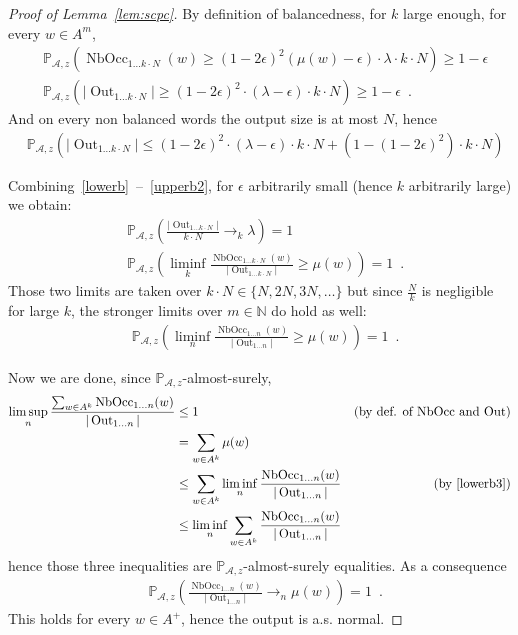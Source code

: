 \documentclass[11pt]{article}
\newcommand{\A}{\mathcal{A}}
\newcommand{\NN}{\mathbb{N}}
\newcommand{\PP}{\mathbb{P}}
\DeclareMathOperator{\nbocc}{NbOcc}
\DeclareMathOperator{\outp}{Out}
\begin{document}
\begin{proof}[Proof of Lemma~\ref{lem:scpc}]
By definition of balancedness, for $k$ large enough, for every $w\in A^m$,
\begin{align}
&\label{lowerb}
\PP_{\A,z}\left(
\nbocc_{1\ldots k\cdot N}(w)
\geq
(1-2\epsilon)^2
\left(\mu(w)- \epsilon\right)
\cdot \lambda \cdot k \cdot N
\right)
\geq  1 - \epsilon
\\
\label{upperb}
&\PP_{\A,z}\left(
|\outp_{1\ldots k\cdot N}|
\geq
(1-2\epsilon)^2\cdot (\lambda -\epsilon) \cdot k\cdot N
\right )\geq  1 - \epsilon
\enspace.
\end{align}
And on every non balanced words the output size is at most $N$, hence
\begin{align}
&\PP_{\A,z}\left(
|\outp_{1\ldots k\cdot N}|
\leq 
(1-2\epsilon)^2\cdot (\lambda -\epsilon) \cdot k\cdot N +
(1 - (1-2\epsilon)^2) \cdot k\cdot N 
\right )
\label{upperb2}
\end{align}


Combining~\eqref{lowerb}~--~\eqref{upperb2}, for $\epsilon$ arbitrarily small
(hence $k$ arbitrarily large)
we obtain:
\begin{align}
&\PP_{\A,z}\left(
\frac{|\outp_{1\ldots k\cdot N}|}{k\cdot N}
\to_k
\lambda
\right)
=1\\
&\PP_{\A,z}
\left(
\liminf_k 
\frac{\nbocc_{1\ldots k\cdot N}(w)}{|\outp_{1\ldots k\cdot N}|}
\geq
\mu(w)
\right)
=1
\enspace.
\end{align}
Those two limits are taken over $k\cdot N\in \{N,2N,3N,\ldots\}$
but 
since $\frac{N}{k}$ is negligible for large $k$, the stronger limits over $m\in \NN$ do hold as well:
\begin{align}
\label{lowerb3}
&\PP_{\A,z}
\left(
\liminf_n
\frac{\nbocc_{1\ldots n}(w)}{|\outp_{1\ldots n}|}
\geq
\mu(w)
\right)
=1
\enspace.
\end{align}

Now we are  done,
since $\PP_{\A,z}$-almost-surely,
\begin{align*}
\limsup_n   \frac{\sum_{w \in A^k} \nbocc_{1\ldots n}(w)}{|\outp_{1\ldots n}|}
&\leq
1& 
\text{(by def. of $\nbocc$ and $\outp$)}\\
&=
\sum_{w \in A^k}
\mu(w)&
\\
&\leq
\sum_{w \in A^k}
\liminf_n
\frac{\nbocc_{1\ldots n}(w)}{|\outp_{1\ldots n}|}
&\text{(by~\eqref{lowerb3})}\\
&\leq
\liminf_n
\sum_{w \in A^k}
\frac{\nbocc_{1\ldots n}(w)}{|\outp_{1\ldots n}|}
&
\end{align*}
hence those three inequalities are $\PP_{\A,z}$-almost-surely equalities.
As a consequence
\begin{align}
&\PP_{\A,z}
\left(
\frac{\nbocc_{1\ldots n}(w)}{|\outp_{1\ldots n}|}
\to_n
\mu(w)
\right)
=1\enspace.
\end{align}
This holds for every $w\in A^+$,
hence the output is a.s. normal.
\end{proof}
\end{document}
